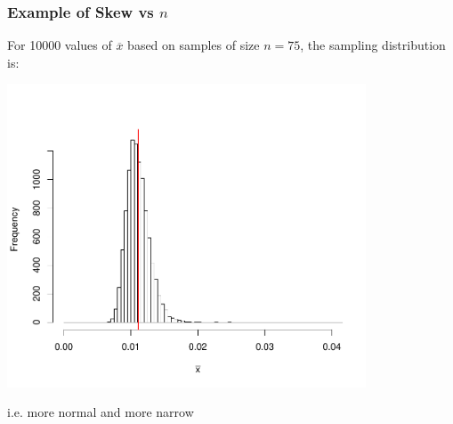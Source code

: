 \documentclass[slides]{beamer}
\newcommand{\blue}[1]{\textcolor{blue2}{#1}}
\newcommand{\xbar}{\overline{x}}
\begin{document}
\begin{frame}
\frametitle{Example of Skew vs $n$}
For 10000 values of $\xbar$ based on samples of size \blue{$n=75$}, the sampling distribution is:
\begin{center}
\includegraphics[width=0.8\textwidth]{figure/hist75.pdf}
\end{center}
\pause\blue{i.e. more normal and more narrow}
\end{frame}
\end{document}
